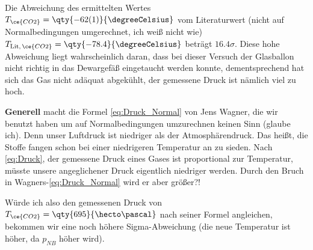 Die Abweichung des ermittelten Wertes \(T_{\ce{CO2}}=\qty{-62(1)}{\degreeCelsius}\) vom Literaturwert (nicht auf Normalbedingungen umgerechnet, ich weiß nicht wie) \(T_{\text{Lit},\,\ce{CO2}}=\qty{-78.4}{\degreeCelsius}\) beträgt \(16.4\sigma\). Diese hohe Abweichung liegt wahrscheinlich daran, dass bei dieser Versuch der Glasballon nicht richtig in das Dewargefäß eingetaucht werden konnte, dementsprechend hat sich das Gas nicht adäquat abgekühlt, der gemessene Druck ist nämlich viel zu hoch.  

\textbf{Generell} macht die Formel \cref{eq:Druck_Normal} von Jens Wagner, die wir benutzt haben um auf Normalbedingungen umzurechnen keinen Sinn (glaube ich). Denn unser Luftdruck ist niedriger als der Atmosphärendruck. Das heißt, die Stoffe fangen schon bei einer niedrigeren Temperatur an zu sieden. Nach \cref{eq:Druck}, der gemessene Druck eines Gases ist proportional zur Temperatur, müsste unsere angeglichener Druck eigentlich niedriger werden. Durch den Bruch in Wagners-\cref{eq:Druck_Normal} wird er aber größer?!

Würde ich also den gemessenen Druck von \(T_{\ce{CO2}}=\qty{695}{\hecto\pascal}\) nach seiner Formel angleichen, bekommen wir eine noch höhere Sigma-Abweichung (die neue Temperatur ist höher, da \(p_{NB}\) höher wird).
 
